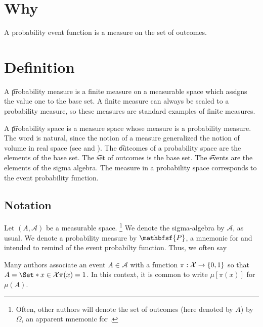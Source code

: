 
\section*{Why}

A probability event function is a measure on the set of outcomes.

\section*{Definition}

A \t{probability measure} is a finite measure on a measurable space which assigns the value one to the base set.
A finite measure can always be scaled to a probability measure, so these measures are standard examples of finite measures.

A \t{probability space} is a measure space whose measure is a probability measure.
The word  is natural, since the notion of a measure generalized the notion of volume in real space (see  and ).
The \t{outcomes} of a probability space are the elements of the base set.
The \t{set of outcomes} is the base set.
The \t{events} are the elements of the sigma algebra.
The measure in a probability space corresponds to the event probability function.

\subsection*{Notation}

Let $(A, \mathcal{A} )$ be a measurable space.
  \ifhmode\unskip\fi\footnote{
Often, other authors will denote the set of outcomes (here denoted by $A$) by $\Omega $, an apparent mnemonic for .
  }
We denote the sigma-algebra by $\mathcal{A} $, as usual.
We denote a probability measure by $\mathbfsf{P} $, a mnemonic for  and intended to remind of the event probabilty function.
Thus, we often say 

Many authors associate an event $A \in \mathcal{A} $ with a function $\pi : \mathcal{X}  \to \{0, 1\}$ so that $A = \Set*{x \in \mathcal{X} }{\pi (x) = 1}$.
In this context, it is common to write $\mu [\pi (x)]$ for $\mu (A)$.

\blankpage